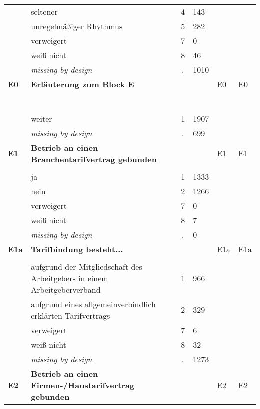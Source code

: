 \begin{longtable}{| L{2.45cm} | L{6cm} | C{1.5cm} | R{1cm} | C{2.25cm} | C{2.25cm} |}
   & seltener & 4 & 143 &  &  \\ 
   & unregelmäßiger Rhythmus & 5 & 282 &  &  \\ 
   & verweigert & 7 & 0 &  &  \\ 
   & weiß nicht & 8 & 46 &  &  \\ 
   & \textit{missing by design} & \textit{.} & 1010 &  &  \\ 
   \midrule
\textbf{E0}\label{var:E0} & \textbf{Erläuterung zum Block E} &  &  & \hyperref[E0]{E0} & \hyperref[var:suf:E0]{E0} \\ 
   & \protect\subsection[Variablen E0 bis E7]{} &  &  &  &  \\ 
   & weiter & 1 & 1907 &  &  \\ 
   & \textit{missing by design} & \textit{.} & 699 &  &  \\ 
   \midrule
\textbf{E1}\label{var:E1} & \textbf{Betrieb an einen Branchentarifvertrag gebunden} &  &  & \hyperref[E1]{E1} & \hyperref[var:suf:E1]{E1} \\ 
   &  &  &  &  &  \\ 
   & ja & 1 & 1333 &  &  \\ 
   & nein & 2 & 1266 &  &  \\ 
   & verweigert & 7 & 0 &  &  \\ 
   & weiß nicht & 8 & 7 &  &  \\ 
   & \textit{missing by design} & \textit{.} & 0 &  &  \\ 
   \midrule
\textbf{E1a}\label{var:E1a} & \textbf{Tarifbindung besteht...} &  &  & \hyperref[E1a]{E1a} & \hyperref[var:suf:E1a]{E1a} \\ 
   &  &  &  &  &  \\ 
   & aufgrund der Mitgliedschaft des Arbeitgebers in einem Arbeitgeberverband & 1 & 966 &  &  \\ 
   & aufgrund eines allgemeinverbindlich erklärten Tarifvertrags & 2 & 329 &  &  \\ 
   & verweigert & 7 & 6 &  &  \\ 
   & weiß nicht & 8 & 32 &  &  \\ 
   & \textit{missing by design} & \textit{.} & 1273 &  &  \\ 
   \midrule
\textbf{E2}\label{var:E2} & \textbf{Betrieb an einen Firmen-/Haustarifvertrag gebunden} &  &  & \hyperref[E2]{E2} & \hyperref[var:suf:E2]{E2} \\ 

\end{longtable}
